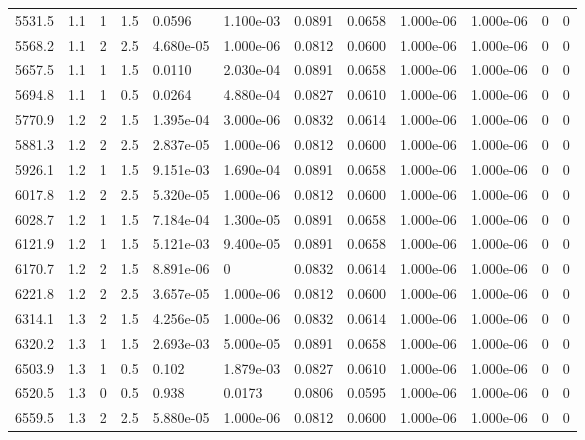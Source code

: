 \documentclass[preview]{standalone}
\begin{document}
{{{\begin{tabular}{L{1.2cm}C{1.2cm} C{0.3cm}C{0.5cm} C{1.4cm}C{1.4cm} C{1.4cm}C{1.4cm} C{1.6cm}C{1.6cm} C{1.6cm}C{1.6cm}}
  5531.5  &   1.1  & 1     & 1.5 &  0.0596  & 1.100e-03  &  0.0891&   0.0658& 1.000e-06 & 1.000e-06   &  0 & 0  \\ 
  5568.2  &   1.1  & 2     & 2.5 &  4.680e-05  & 1.000e-06  &  0.0812&   0.0600& 1.000e-06 & 1.000e-06   &  0 & 0  \\ 
  5657.5  &   1.1  & 1     & 1.5 &  0.0110  & 2.030e-04  &  0.0891&   0.0658& 1.000e-06 & 1.000e-06   &  0 & 0  \\ 
  5694.8  &   1.1  & 1     & 0.5 &  0.0264  & 4.880e-04  &  0.0827&   0.0610& 1.000e-06 & 1.000e-06   &  0 & 0  \\ 
  5770.9  &   1.2  & 2     & 1.5 &  1.395e-04  & 3.000e-06  &  0.0832&   0.0614& 1.000e-06 & 1.000e-06   &  0 & 0  \\ 
  5881.3  &   1.2  & 2     & 2.5 &  2.837e-05  & 1.000e-06  &  0.0812&   0.0600& 1.000e-06 & 1.000e-06   &  0 & 0  \\ 
  5926.1  &   1.2  & 1     & 1.5 &  9.151e-03  & 1.690e-04  &  0.0891&   0.0658& 1.000e-06 & 1.000e-06   &  0 & 0  \\ 
  6017.8  &   1.2  & 2     & 2.5 &  5.320e-05  & 1.000e-06  &  0.0812&   0.0600& 1.000e-06 & 1.000e-06   &  0 & 0  \\ 
  6028.7  &   1.2  & 1     & 1.5 &  7.184e-04  & 1.300e-05  &  0.0891&   0.0658& 1.000e-06 & 1.000e-06   &  0 & 0  \\ 
  6121.9  &   1.2  & 1     & 1.5 &  5.121e-03  & 9.400e-05  &  0.0891&   0.0658& 1.000e-06 & 1.000e-06   &  0 & 0  \\ 
  6170.7  &   1.2  & 2     & 1.5 &  8.891e-06  & 0  &  0.0832&   0.0614& 1.000e-06 & 1.000e-06   &  0 & 0  \\ 
  6221.8  &   1.2  & 2     & 2.5 &  3.657e-05  & 1.000e-06  &  0.0812&   0.0600& 1.000e-06 & 1.000e-06   &  0 & 0  \\ 
  6314.1  &   1.3  & 2     & 1.5 &  4.256e-05  & 1.000e-06  &  0.0832&   0.0614& 1.000e-06 & 1.000e-06   &  0 & 0  \\ 
  6320.2  &   1.3  & 1     & 1.5 &  2.693e-03  & 5.000e-05  &  0.0891&   0.0658& 1.000e-06 & 1.000e-06   &  0 & 0  \\ 
  6503.9  &   1.3  & 1     & 0.5 &  0.102  & 1.879e-03  &  0.0827&   0.0610& 1.000e-06 & 1.000e-06   &  0 & 0  \\ 
  6520.5  &   1.3  & 0     & 0.5 &  0.938  & 0.0173  &  0.0806&   0.0595& 1.000e-06 & 1.000e-06   &  0 & 0  \\ 
  6559.5  &   1.3  & 2     & 2.5 &  5.880e-05  & 1.000e-06  &  0.0812&   0.0600& 1.000e-06 & 1.000e-06   &  0 & 0  \\ 

\end{tabular}}}}
\end{document}
